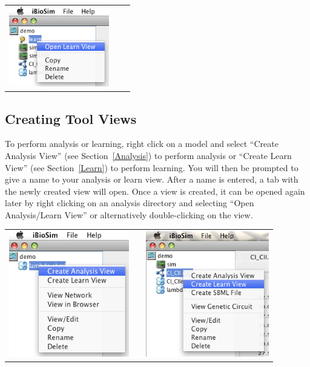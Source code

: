 \documentclass[titlepage,11pt]{article}
\begin{document}
\begin{center}
\begin{tabular}{ccc}
\includegraphics[height=35mm]{screenshots/modLearn}
\end{tabular}
\end{center}

\subsection{Creating Tool Views}

\noindent
To perform analysis or learning, right click on a model and
select ``Create Analysis View'' (see Section~\ref{Analysis})
to perform analysis or ``Create Learn View'' (see Section~\ref{Learn})
to perform learning. You will then be prompted to give a name to
your analysis or learn view. After a name is entered, a tab with
the newly created view will open. Once a view is created, it can
be opened again later by right clicking on an analysis directory
and selecting ``Open Analysis/Learn View'' or alternatively
double-clicking on the view.
\begin{center}
\begin{tabular}{ccc}
\includegraphics[height=55mm]{screenshots/createAnalysis} & & 
\includegraphics[height=55mm]{screenshots/createLearn}
\end{tabular}
\end{center}
\end{document}
